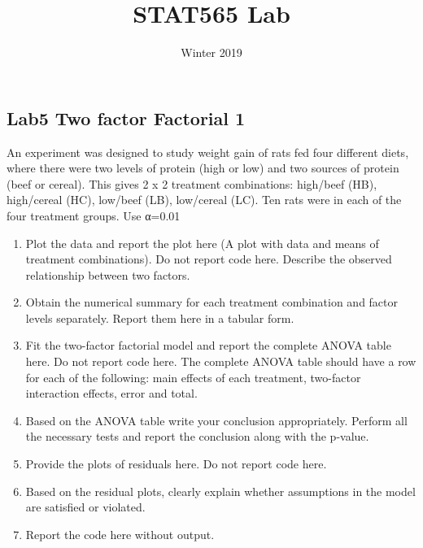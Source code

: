 \documentclass[]{article}
\title{STAT565 Lab}
\author{}
\date{Winter 2019}
\begin{document}
\maketitle

\hypertarget{section}{%
\section{}\label{section}}

\hypertarget{lab5-two-factor-factorial-1}{%
\subsection{Lab5 Two factor Factorial
1}\label{lab5-two-factor-factorial-1}}

An experiment was designed to study weight gain of rats fed four
different diets, where there were two levels of protein (high or low)
and two sources of protein (beef or cereal). This gives 2 x 2 treatment
combinations: high/beef (HB), high/cereal (HC), low/beef (LB),
low/cereal (LC). Ten rats were in each of the four treatment groups. Use
α=0.01

\begin{enumerate}
\def\labelenumi{(\alph{enumi})}
\item
  Plot the data and report the plot here (A plot with data and means of
  treatment combinations). Do not report code here. Describe the
  observed relationship between two factors.
\item
  Obtain the numerical summary for each treatment combination and factor
  levels separately. Report them here in a tabular form.
\item
  Fit the two-factor factorial model and report the complete ANOVA table
  here. Do not report code here. The complete ANOVA table should have a
  row for each of the following: main effects of each treatment,
  two-factor interaction effects, error and total.
\item
  Based on the ANOVA table write your conclusion appropriately. Perform
  all the necessary tests and report the conclusion along with the
  p-value.
\item
  Provide the plots of residuals here. Do not report code here.
\item
  Based on the residual plots, clearly explain whether assumptions in
  the model are satisfied or violated.
\item
  Report the code here without output.
\end{enumerate}
\end{document}
